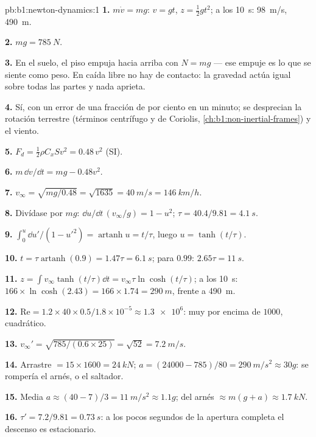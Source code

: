\begin{solution}{pb:b1:newton-dynamics:1}
\textbf{1.} $m\dot v = mg$: $v = gt$, $z = \tfrac12 gt^2$; a los \qty{10}{s}:
\qty{98}{m/s}, \qty{490}{m}.

\textbf{2.} $mg = \qty{785}{N}$.

\textbf{3.} En el suelo, el piso empuja hacia arriba con $N = mg$ --- ese
empuje es lo que se siente como peso. En caída libre no hay  de
contacto: la gravedad actúa igual sobre todas las partes y nada aprieta.

\textbf{4.} Sí, con un error de una fracción de por ciento en un minuto;
se desprecian la rotación terrestre (términos centrífugo y de Coriolis,
\cref{ch:b1:non-inertial-frames}) y el viento.

\textbf{5.} $F_d = \tfrac12\rho C_xSv^2 = 0.48\,v^2$ (SI).

\textbf{6.} $m\,\dd v/\dd t = mg - 0.48v^2$.

\textbf{7.} $v_\infty = \sqrt{mg/0.48} = \sqrt{1635} = \qty{40}{m/s} =
\qty{146}{km/h}$.

\textbf{8.} Divídase por $mg$: $\dd u/\dd t\,(v_\infty/g) = 1 - u^2$;
$\tau = 40.4/9.81 = \qty{4.1}{s}$.

\textbf{9.} $\int_0^u\dd u'/(1 - u'^2) = \operatorname{artanh}u = t/\tau$,
luego $u = \tanh(t/\tau)$.

\textbf{10.} $t = \tau\operatorname{artanh}(0.9) = 1.47\tau = \qty{6.1}{s}$;
para $0.99$: $2.65\tau = \qty{11}{s}$.

\textbf{11.} $z = \int v_\infty\tanh(t/\tau)\dd t = v_\infty\tau\ln\cosh(t/\tau)$;
a los \qty{10}{s}: $166 \times \ln\cosh(2.43) = 166 \times 1.74 = \qty{290}{m}$,
frente a \qty{490}{m}.

\textbf{12.} $\mathrm{Re} = 1.2 \times 40 \times 0.5/1.8\times10^{-5} \approx
\num{1.3e6}$: muy por encima de $1000$, cuadrático.

\textbf{13.} $v_\infty' = \sqrt{785/(0.6 \times 25)} = \sqrt{52} = \qty{7.2}{m/s}$.

\textbf{14.} Arrastre $= 15 \times 1600 = \qty{24}{kN}$; $a = (24000 - 785)/80
= \qty{290}{m/s^2} \approx 30g$: se rompería el arnés, o el saltador.

\textbf{15.} Media $a \approx (40 - 7)/3 = \qty{11}{m/s^2} \approx 1.1g$;
 del arnés $\approx m(g + a) \approx \qty{1.7}{kN}$.

\textbf{16.} $\tau' = 7.2/9.81 = \qty{0.73}{s}$: a los pocos segundos de
la apertura completa el descenso es estacionario.


\end{solution}
